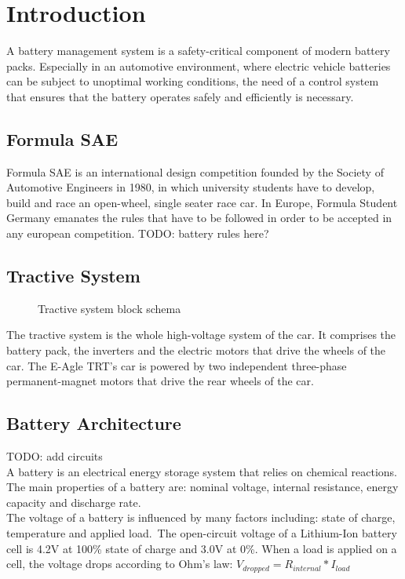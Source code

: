 \chapter{Introduction}
\label{cha:intro}
A battery management system is a safety-critical component of modern battery packs. Especially in an automotive environment, where electric vehicle batteries can be subject to unoptimal working conditions, the need of a control system that ensures that the battery operates safely and efficiently is necessary.

\section{Formula SAE}
Formula SAE is an international design competition founded by the Society of Automotive Engineers in 1980, in which university students have to develop, build and race an open-wheel, single seater race car.
In Europe, Formula Student Germany emanates the rules that have to be followed in order to be accepted in any european competition.
TODO: battery rules here?\\

\section{Tractive System}
\begin{figure}[h]
    \centering
    
    \caption{Tractive system block schema}
    \label{fig:tractive_system}
\end{figure}

The tractive system is the whole high-voltage system of the car. It comprises the battery pack, the inverters and the electric motors that drive the wheels of the car.
The E-Agle TRT's car is powered by two independent three-phase permanent-magnet motors that drive the rear wheels of the car.

\section{Battery Architecture}
TODO: add circuits\\
A battery is an electrical energy storage system that relies on chemical reactions. The main properties of a battery are: nominal voltage, internal resistance, energy capacity and discharge rate.\\
The voltage of a battery is influenced by many factors including: state of charge, temperature and applied load.\ The open-circuit voltage of a Lithium-Ion battery cell is 4.2V at 100\% state of charge and 3.0V at 0\%.
When a load is applied on a cell, the voltage drops according to Ohm's law: $V_{dropped} = R_{internal}*I_{load}$

